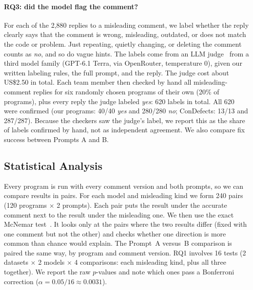 \documentclass[sigconf,nonacm]{acmart}
\newcommand{\cd}{ConDefects}
\begin{document}
\paragraph{RQ3: did the model flag the comment?} For each of the 2,880 replies to a misleading comment, we label whether the reply clearly says that the comment is wrong, misleading, outdated, or does not match the code or problem. Just repeating, quietly changing, or deleting the comment counts as \emph{no}, and so do vague hints. The labels come from an LLM judge~\cite{zheng2023judging} from a third model family (GPT-6.1 Terra, via OpenRouter, temperature 0), given our written labeling rules, the full prompt, and the reply. The judge cost about US\$2.50 in total. Each team member then checked by hand all misleading-comment replies for six randomly chosen programs of their own (20\% of programs), plus every reply the judge labeled \emph{yes}: 620 labels in total. All 620 were confirmed (our programs: 40/40 \emph{yes} and 280/280 \emph{no}; \cd{}: 13/13 and 287/287). Because the checkers saw the judge's label, we report this as the share of labels confirmed by hand, not as independent agreement. We also compare fix success between Prompts A and B.

\subsection{Statistical Analysis}
Every program is run with every comment version and both prompts, so we can compare results in pairs. For each model and misleading kind we form 240 pairs (120 programs $\times$ 2 prompts). Each pair puts the result under the accurate comment next to the result under the misleading one. We then use the exact McNemar test~\cite{mcnemar1947}. It looks only at the pairs where the two results differ (fixed with one comment but not the other) and checks whether one direction is more common than chance would explain. The Prompt~A versus~B comparison is paired the same way, by program and comment version. RQ1 involves 16 tests (2 datasets $\times$ 2 models $\times$ 4 comparisons: each misleading kind, plus all three together). We report the raw $p$-values and note which ones pass a Bonferroni correction ($\alpha = 0.05/16 \approx 0.0031$).
\end{document}
